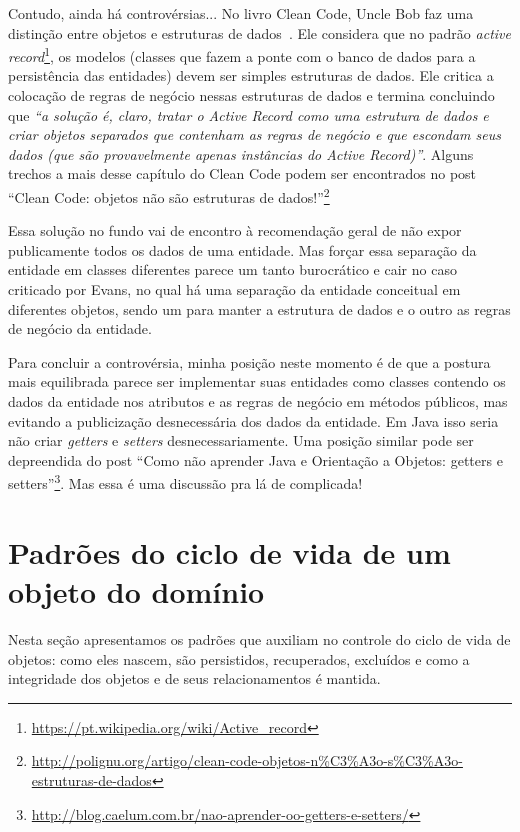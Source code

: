 \documentclass[a4paper, 12pt]{article}
\newcommand{\citacao}[1]{\emph{``#1''}}
\begin{document}
Contudo, ainda há controvérsias... No livro Clean Code, Uncle Bob faz uma distinção entre objetos e estruturas de dados~\cite{Bob2008DataStructures}. Ele considera que no padrão \emph{active record}\footnote{\url{https://pt.wikipedia.org/wiki/Active_record}}, os modelos (classes que fazem a ponte com o banco de dados para a persistência das entidades) devem ser simples estruturas de dados. Ele critica a colocação de regras de negócio nessas estruturas de dados e termina concluindo que \citacao{a solução é, claro, tratar o Active Record como uma estrutura de dados e criar objetos separados que contenham as regras de negócio e que escondam seus dados (que são provavelmente apenas instâncias do Active Record)}. Alguns trechos a mais desse capítulo do Clean Code podem ser encontrados no post ``Clean Code: objetos não são estruturas de dados!''\footnote{\url{http://polignu.org/artigo/clean-code-objetos-n\%C3\%A3o-s\%C3\%A3o-estruturas-de-dados}} 

Essa solução no fundo vai de encontro à recomendação geral de não expor publicamente todos os dados de uma entidade. Mas forçar essa separação da entidade em classes diferentes parece um tanto burocrático e cair no caso criticado por Evans, no qual há uma separação da entidade conceitual em diferentes objetos, sendo um para manter a estrutura de dados e o outro as regras de negócio da entidade.

Para concluir a controvérsia, minha posição neste momento é de que a postura mais equilibrada parece ser implementar suas entidades como classes contendo os dados da entidade nos atributos e as regras de negócio em métodos públicos, mas evitando a publicização desnecessária dos dados da entidade. Em Java isso seria não criar \emph{getters} e \emph{setters} desnecessariamente. Uma posição similar pode ser depreendida do post ``Como não aprender Java e Orientação a Objetos: getters e setters''\footnote{\url{http://blog.caelum.com.br/nao-aprender-oo-getters-e-setters/}}. Mas essa é uma discussão pra lá de complicada!



\section{Padrões do ciclo de vida de um objeto do domínio}

Nesta seção apresentamos os padrões que auxiliam no controle do ciclo de vida de objetos: como eles nascem, são persistidos, recuperados, excluídos e como a integridade dos objetos e de seus relacionamentos é mantida.
\end{document}
